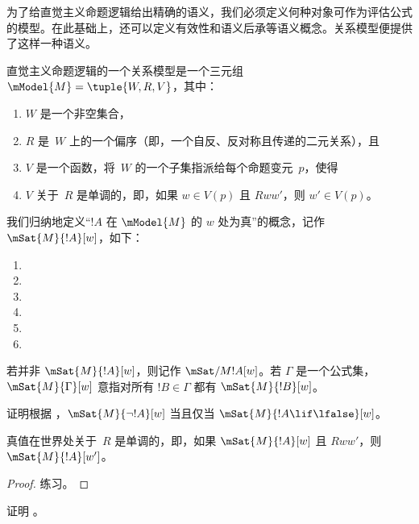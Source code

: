 \documentclass[../../../include/open-logic-section]{subfiles}
\begin{document}


为了给直觉主义命题逻辑给出精确的语义，我们必须定义何种对象可作为评估公式的模型。在此基础上，还可以定义有效性和语义后承等语义概念。关系模型便提供了这样一种语义。

\begin{defn}
  直觉主义命题逻辑的一个关系模型是一个三元组 $\mModel{M} = \tuple{W, R, V}$，其中：
  \begin{enumerate}
  \item $W$ 是一个非空集合，
  \item $R$ 是~$W$ 上的一个偏序（即，一个自反、反对称且传递的二元关系），且
  \item $V$ 是一个函数，将~$W$ 的一个子集指派给每个命题变元~$p$，使得
  \item $V$ 关于~$R$ 是单调的，即，如果 $w \in V(p)$ 且 $Rww'$，则 $w' \in V(p)$。
  \end{enumerate}
\end{defn}

\begin{defn}
  我们归纳地定义“$!A$ 在 $\mModel{M}$ 的 $w$ 处为真”的概念，记作 $\mSat{M}{!A}[w]$，如下：
  \begin{enumerate}
  \item {}
  \item {}
  \item {}
  \item {}
  \item {}
  \item {}
  \end{enumerate}
  若并非 $\mSat{M}{!A}[w]$，则记作 $\mSat/{M}{!A}[w]$。若 $\Gamma$ 是一个公式集，$\mSat{M}{\Gamma}[w]$ 意指对所有 $!B \in \Gamma$ 都有 $\mSat{M}{!B}[w]$。
\end{defn}

\begin{prob}
  证明根据 ，$\mSat{M}{\lnot !A}[w]$ 当且仅当 $\mSat{M}{!A \lif \lfalse}[w]$。
\end{prob}

\begin{prop}
  真值在世界处关于~$R$ 是单调的，即，如果 $\mSat{M}{!A}[w]$ 且 $Rww'$，则 $\mSat{M}{!A}[w']$。
\end{prop}

\begin{proof}
  练习。
\end{proof}

\begin{prob}
  证明 。
\end{prob}
\end{document}
